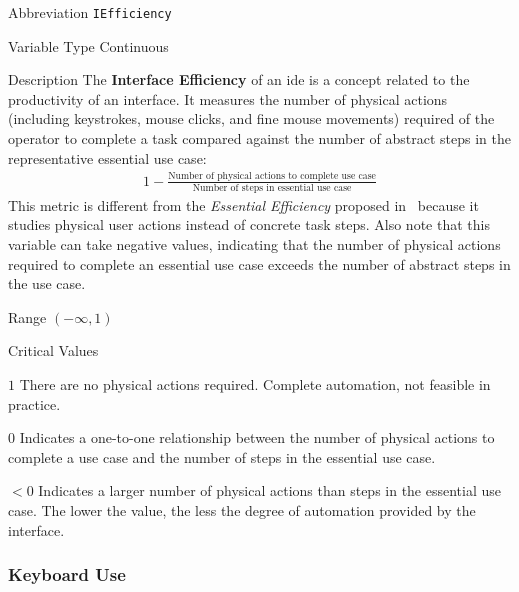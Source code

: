 \begin{AlignedDesc}
  \item[Abbreviation] \texttt{IEfficiency}

  \item[Variable Type] Continuous

  \item[Description] The \textbf{Interface Efficiency} of an \ac{ide} is a
  concept related to the productivity of an interface. It measures the
  number of physical actions (including keystrokes, mouse clicks, and fine
  mouse movements) required of the operator to complete a task compared
  against the number of abstract steps in the representative essential use
  case:
%
  \begin{align*}
    1 - \frac{\text{Number of physical actions to complete use case}}
             {\text{Number of steps in essential use case}}
  \end{align*}
%
  This metric is different from the \textit{Essential Efficiency} proposed
  in~\cite{constantine1996} because it studies physical user actions
  instead of concrete task steps. Also note that this variable can take
  negative values, indicating that the number of physical actions required
  to complete an essential use case exceeds the number of abstract steps in
  the use case.

  \item[Range] $(-\infty, 1)$

  \item[Critical Values]
  \begin{AlignedDesc}
    \item[$1$] There are no physical actions required. Complete automation,
    not feasible in practice.
    \item[$0$] Indicates a one-to-one relationship between the number of
    physical actions to complete a use case and the number of steps in the
    essential use case.
    \item[$<0$] Indicates a larger number of physical actions than steps in
    the essential use case. The lower the value, the less the degree of
    automation provided by the interface.
  \end{AlignedDesc}

\end{AlignedDesc}

\subsubsection{Keyboard Use}
\label{subsubsec:keyboard}

